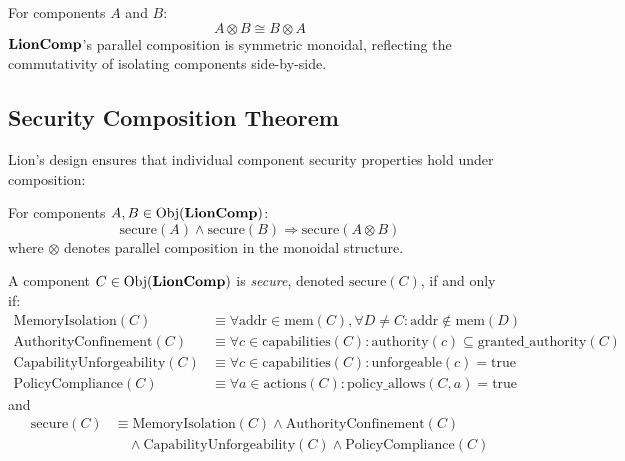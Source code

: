 \begin{theorem}[Symmetry]
For components $A$ and $B$:
\begin{equation}
A \otimes B \cong B \otimes A
\end{equation}
$\mathbf{LionComp}$'s parallel composition is symmetric monoidal, reflecting the commutativity of isolating components side-by-side.
\end{theorem}

\subsection{Security Composition Theorem}

Lion's design ensures that individual component security properties hold under composition:

\begin{theorem}
For components $A, B \in \mathrm{Obj}(\mathbf{LionComp})$:
\begin{equation}
\text{secure}(A) \land \text{secure}(B) \Rightarrow \text{secure}(A \otimes B)
\end{equation}
where $\otimes$ denotes parallel composition in the monoidal structure.
\end{theorem}

\begin{definition}
A component $C \in \mathrm{Obj}(\mathbf{LionComp})$ is \emph{secure}, denoted $\text{secure}(C)$, if and only if:
\begin{align}
\text{MemoryIsolation}(C) &\equiv \forall \text{addr} \in \text{mem}(C), \forall D \neq C: \text{addr} \notin \text{mem}(D) \\
\text{AuthorityConfinement}(C) &\equiv \forall c \in \text{capabilities}(C): \text{authority}(c) \subseteq \text{granted\_authority}(C) \\
\text{CapabilityUnforgeability}(C) &\equiv \forall c \in \text{capabilities}(C): \text{unforgeable}(c) = \text{true} \\
\text{PolicyCompliance}(C) &\equiv \forall a \in \text{actions}(C): \text{policy\_allows}(C, a) = \text{true}
\end{align}
and
\begin{align}
\text{secure}(C) &\equiv \text{MemoryIsolation}(C) \land \text{AuthorityConfinement}(C) \nonumber \\
&\quad \land \text{CapabilityUnforgeability}(C) \land \text{PolicyCompliance}(C)
\end{align}
\end{definition}


